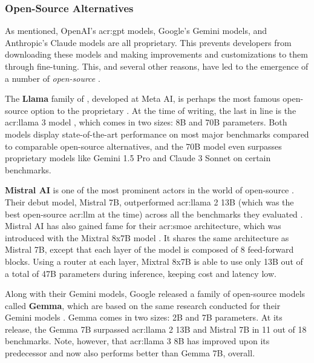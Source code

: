 \subsubsection{Open-Source Alternatives}
\label{subsubsec:open-source-llms}

As mentioned, OpenAI's \acrshort{acr:gpt} models, Google's Gemini models, and Anthropic's Claude models are all proprietary. This prevents developers from downloading these models and making improvements and customizations to them through fine-tuning. This, and several other reasons, have led to the emergence of a number of \textit{open-source} .

The \textbf{Llama} family of , developed at Meta AI, is perhaps the most famous open-source option to the proprietary . At the time of writing, the last in line is the \acrshort{acr:llama} 3 model \citep{metaaiIntroducingMetaLlama2024}, which comes in two sizes: 8B and 70B parameters. Both models display state-of-the-art performance on most major benchmarks compared to comparable open-source alternatives, and the 70B model even surpasses proprietary models like Gemini 1.5 Pro and Claude 3 Sonnet on certain benchmarks.

\textbf{Mistral AI} is one of the most prominent actors in the world of open-source . Their debut model, Mistral 7B, outperformed \acrshort{acr:llama} 2 13B (which was the best open-source \acrshort{acr:llm} at the time) across all the benchmarks they evaluated \citep{jiangMistral7B2023}. Mistral AI has also gained fame for their \gls{acr:smoe} architecture, which was introduced with the Mixtral 8x7B model \citep{jiangMixtralExperts2024}. It shares the same architecture as Mistral 7B, except that each layer of the model is composed of 8 feed-forward blocks. Using a router at each layer, Mixtral 8x7B is able to use only 13B out of a total of 47B parameters during inference, keeping cost and latency low.

Along with their Gemini models, Google released a family of open-source models called \textbf{Gemma}, which are based on the same research conducted for their Gemini models \citep{gemmateamGemmaOpenModels2024}. Gemma comes in two sizes: 2B and 7B parameters. At its release, the Gemma 7B surpassed \acrshort{acr:llama} 2 13B and Mistral 7B  in 11 out of 18 benchmarks. Note, however, that \acrshort{acr:llama} 3 8B has improved upon its predecessor and now also performs better than Gemma 7B, overall.


